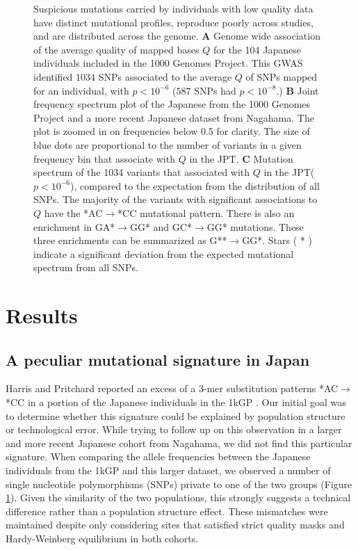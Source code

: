 \documentclass[9pt,article]{template}
\begin{document}
\begin{figure}
\caption{
Suspicious mutations carried by individuals with low quality data have distinct mutational profiles, reproduce poorly across studies, and are distributed across the genome.
\textbf{A} 
Genome wide association of the average quality of mapped bases $Q$ for the 104 Japanese individuals included in the 1000 Genomes Project. 
This GWAS identified $1034$ SNPs associated to the average $Q$ of SNPs mapped for an individual, with  $p < 10^{-6}$
($587$ SNPs had  $p < 10^{-8}.$)
\textbf{B} 
Joint frequency spectrum plot of the Japanese from the 1000 Genomes Project and a more recent Japanese dataset from Nagahama.
The plot is zoomed in on frequencies below 0.5 for clarity.
The size of blue dots are proportional to the number of variants in a given frequency bin that associate with $Q$ in the JPT. 
\textbf{C} 
Mutation spectrum of the 1034 variants that associated with $Q$ in the JPT($p < 10^{-6}$), compared to the expectation from the distribution of all SNPs.
The majority of the variants with significant associations to $Q$ have the *AC${\rightarrow}$*CC mutational pattern. 
There is also an enrichment in GA*${\rightarrow}$GG* and GC*${\rightarrow}$GG* mutations. 
These three enrichments can be summarized as G**${\rightarrow}$GG*. 
Stars ( * ) indicate a significant deviation from the expected mutational spectrum from all SNPs.
}
 \label{SFS}
\end{figure}


\section{Results}

			
\subsection{A peculiar mutational signature in Japan}			
	
Harris and Pritchard reported an excess of a 3-mer substitution patterns *AC${\rightarrow}$*CC in a portion of the Japanese individuals in the 1kGP \citep{Harris2017a}.
Our initial goal was to determine whether this signature could be explained by population structure or technological error.
While trying to follow up on this observation in a larger and more recent Japanese cohort from Nagahama, we did not find this particular signature.
When comparing the allele frequencies between the Japanese individuals from the 1kGP and this larger dataset, we observed a number of single nucleotide polymorphisms (SNPs) private to one of the two groups (Figure \ref{SFS}).
Given the similarity of the two populations, this strongly suggests a technical difference rather than a population structure effect.
These mismatches were maintained despite only considering sites that satisfied strict quality masks and Hardy-Weinberg equilibrium in both cohorts.
\end{document}
